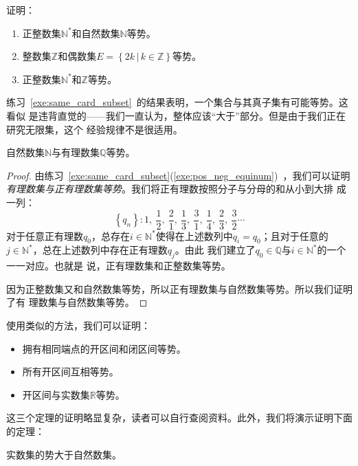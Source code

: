 \begin{exercise}\label{exe:same_card_subset}
    证明：
    \begin{enumerate}
        \item 正整数集$\mathbb{N}^\ast$和自然数集$\mathbb{N}$等势。

        \item 整数集$\mathbb{Z}$和偶数集$E = \left\{ 2k\,|\,k\in \mathbb{Z} \right\}
            $等势。

        \item 正整数集$\mathbb{N}^\ast$和$\mathbb{Z}$等势。\label{exe:pos_neg_equinum}
    \end{enumerate}
\end{exercise}

练习~\ref{exe:same_card_subset}~的结果表明，一个集合与其真子集有可能等势。这看似
是违背直觉的——我们一直认为，整体应该“大于”部分。但是由于我们正在研究无限集，这个
经验规律不是很适用。

\begin{rawthm}\label{thm:N_Q_equinum}
    自然数集$\mathbb{N}$与有理数集$\mathbb{Q}$等势。
\end{rawthm}

\begin{proof}
    由练习~\ref{exe:same_card_subset}(\ref{exe:pos_neg_equinum})~，我们可以证明
    \emph{有理数集与正有理数集等势}。我们将正有理数按照分子与分母的和从小到大排
    成一列：
    \[
        \left\{ q_n \right\} : 1,\ \frac{1}{2},\ \frac{2}{1},\ \frac{1}{3},\ \frac{3}
        {1},\ \frac{1}{4},\ \frac{2}{3},\ \frac{3}{2}\cdots
    \]
    对于任意正有理数$q_0$，总存在$i\in \mathbb{N}^\ast$使得在上述数列中$q_i=q_{0}
    $；且对于任意的$j\in\mathbb{N}^\ast$，总在上述数列中存在正有理数$q_j$。由此
    我们建立了$q_{0}\in\mathbb{Q}$与$i\in\mathbb{N}^\ast$的一个一一对应。也就是
    说，正有理数集和正整数集等势。

    因为正整数集又和自然数集等势，所以正有理数集与自然数集等势。所以我们证明了有
    理数集与自然数集等势。
\end{proof}

使用类似的方法，我们可以证明：
\begin{itemize}
    \item 拥有相同端点的开区间和闭区间等势。

    \item 所有开区间互相等势。

    \item 开区间与实数集$\mathbb{R}$等势。
\end{itemize}

这三个定理的证明略显复杂，读者可以自行查阅资料。此外，我们将演示证明下面的定理：

\begin{rawthm}
    实数集的势大于自然数集。
\end{rawthm}

